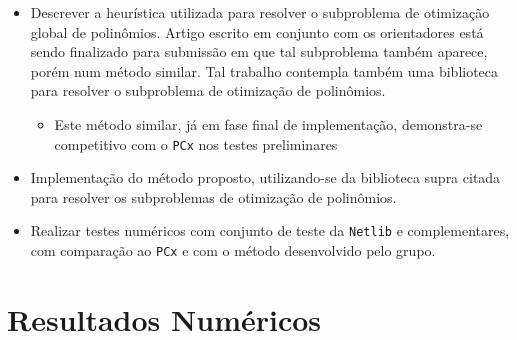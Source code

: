 \begin{itemize}
\item Descrever a heurística utilizada para resolver o subproblema de otimização
global de polinômios. Artigo escrito em conjunto com os orientadores está sendo
finalizado para submissão em que tal subproblema também aparece, porém num
método similar. Tal trabalho contempla também uma biblioteca para resolver o
subproblema de otimização de polinômios.
\begin{itemize}
  \item Este método similar, já em fase final de implementação,
  demonstra-se competitivo com o \texttt{PCx} nos testes preliminares
 \end{itemize}
\item Implementação do método proposto, utilizando-se da biblioteca supra
citada para resolver os subproblemas de otimização de polinômios.
\item Realizar  testes
numéricos com conjunto de teste da \texttt{Netlib} e complementares, com
comparação ao \texttt{PCx} e com o método desenvolvido pelo grupo.
\end{itemize}



\section{Resultados Numéricos}